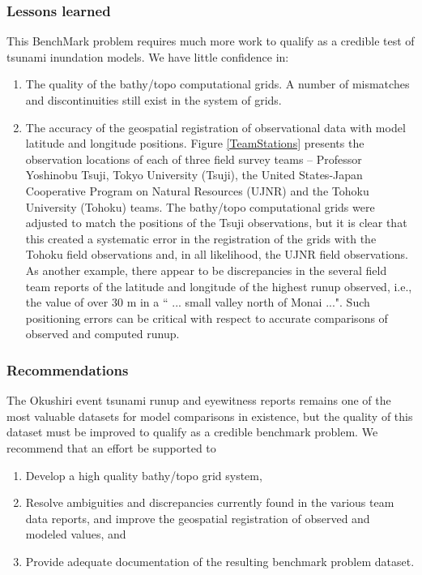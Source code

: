 \subsubsection{Lessons learned}
This BenchMark problem requires much more work to qualify as a credible test of tsunami inundation models.  We have little confidence in:
\begin{enumerate}
\item The quality of the bathy/topo computational grids.  A number of mismatches and discontinuities still exist in the system of grids.
\item The accuracy of the geospatial registration of observational data with model latitude and longitude positions.  Figure \ref{TeamStations} presents the observation locations of each of three field survey teams -- Professor Yoshinobu Tsuji, Tokyo University (Tsuji), the United States-Japan Cooperative Program on Natural Resources (UJNR) and the Tohoku University (Tohoku) teams.  The bathy/topo computational grids were adjusted to match the positions of the Tsuji observations, but it is clear that this created a systematic error in the registration of the grids with the Tohoku field observations and, in all likelihood, the UJNR field observations.  As another example, there appear to be discrepancies in the several field team reports of the latitude and longitude of the highest runup observed, i.e., the value of over 30 m in a `` ... small valley north of Monai ...".  Such positioning errors can be critical with respect to accurate comparisons of observed and computed runup.
\end{enumerate}

\subsubsection{Recommendations}
The Okushiri event tsunami runup and eyewitness reports remains one of the most valuable datasets for model comparisons in existence, but the quality of this dataset must be improved to qualify as a credible benchmark problem.  We recommend that an effort be supported to 
\begin{enumerate}
\item Develop a high quality bathy/topo grid system,
\item Resolve ambiguities and discrepancies currently found in the various team data reports, and improve the geospatial registration of observed and modeled values, and
\item Provide adequate documentation of the resulting benchmark problem dataset.
\end{enumerate}
